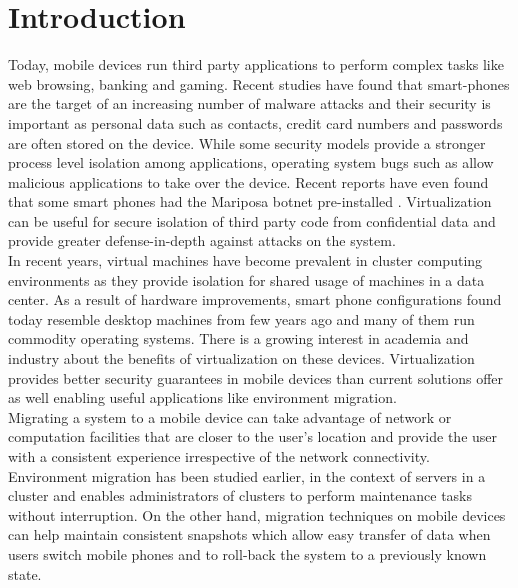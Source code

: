\section{Introduction}
Today, mobile devices run third party applications to perform complex tasks like web browsing, banking and gaming. Recent studies have found that smart-phones are the target of an increasing number of malware attacks \cite{bose2006mobile, cybercriminals2007banks, iphone2010seriot} and their security is important as personal data such as contacts, credit card numbers and passwords are often stored on the device. While some security models \cite{androidsecurity} provide a stronger process level isolation among applications, operating system bugs such as \cite{sms2009iphone,opencore2009android,kernel2009vulnerability} allow malicious applications to take over the device. Recent reports have even found that some smart phones had the Mariposa botnet pre-installed \cite{mariposa2009android}. Virtualization can be useful for secure isolation of third party code from confidential data and provide greater defense-in-depth against attacks on the system.\\

In recent years, virtual machines have become prevalent in cluster computing environments \cite{gartner2009virtual} as they provide isolation for shared usage of machines in a data center. As a result of hardware improvements, smart phone configurations found today resemble desktop machines from few years ago and many of them run commodity operating systems. There is a growing interest in academia \cite{cox2007pocket} and industry \cite{vmware2009nextfrontier} about the benefits of virtualization on these devices. Virtualization provides better security guarantees in mobile devices than current solutions offer as well enabling useful applications like environment migration. \\

Migrating a system to a mobile device can take advantage of network or computation facilities that are closer to the user's location and provide the user with a consistent experience irrespective of the network connectivity. Environment migration has been studied earlier, in the context of servers in a cluster \cite{clark2005live} and enables administrators of clusters to perform maintenance tasks without interruption. On the other hand, migration techniques on mobile devices can help maintain consistent snapshots which allow easy transfer of data when users switch mobile phones and to roll-back the system to a previously known state.\\

